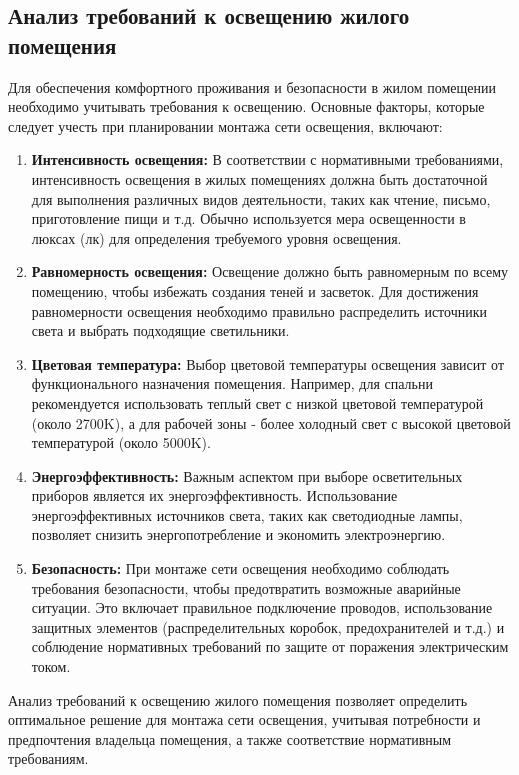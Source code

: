 \documentclass{article}
\begin{document}
\subsection{Анализ требований к освещению жилого помещения}
Для обеспечения комфортного проживания и безопасности в жилом помещении необходимо учитывать требования к освещению. Основные факторы, которые следует учесть при планировании монтажа сети освещения, включают:
\begin{enumerate}
\item \textbf{Интенсивность освещения:} В соответствии с нормативными требованиями, интенсивность освещения в жилых помещениях должна быть достаточной для выполнения различных видов деятельности, таких как чтение, письмо, приготовление пищи и т.д. Обычно используется мера освещенности в люксах (лк) для определения требуемого уровня освещения.
\item \textbf{Равномерность освещения:} Освещение должно быть равномерным по всему помещению, чтобы избежать создания теней и засветок. Для достижения равномерности освещения необходимо правильно распределить источники света и выбрать подходящие светильники.
\item \textbf{Цветовая температура:} Выбор цветовой температуры освещения зависит от функционального назначения помещения. Например, для спальни рекомендуется использовать теплый свет с низкой цветовой температурой (около 2700K), а для рабочей зоны - более холодный свет с высокой цветовой температурой (около 5000K).
\item \textbf{Энергоэффективность:} Важным аспектом при выборе осветительных приборов является их энергоэффективность. Использование энергоэффективных источников света, таких как светодиодные лампы, позволяет снизить энергопотребление и экономить электроэнергию.
\item \textbf{Безопасность:} При монтаже сети освещения необходимо соблюдать требования безопасности, чтобы предотвратить возможные аварийные ситуации. Это включает правильное подключение проводов, использование защитных элементов (распределительных коробок, предохранителей и т.д.) и соблюдение нормативных требований по защите от поражения электрическим током.
\end{enumerate}
Анализ требований к освещению жилого помещения позволяет определить оптимальное решение для монтажа сети освещения, учитывая потребности и предпочтения владельца помещения, а также соответствие нормативным требованиям.
\end{document}
